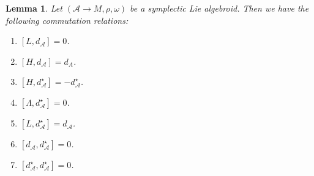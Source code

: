 \documentclass{amsart}
\newcommand{\ra}{\rightarrow}
\newtheorem{lemma}[theorem]{Lemma}
\newcommand{\A}{\mathcal{A}}
\theoremstyle{definition}
\begin{document}
\begin{lemma}\label{AlgebroidCommutators}
    Let $(\A \ra M,\rho,\omega)$ be a symplectic Lie algebroid. Then we have the following commutation relations:
    \begin{enumerate}
        \item $[L,d_\A]=0$.
        \item $[H,d_\A]=d_A$.
        \item $[H,d_\A^\star]=-d_\A^\star$.
        \item $[\Lambda , d_\A^\star]=0$.
        \item $[L,d_\A^\star]=d_\A$.
        \item $[d_\A,d_\A^\star]=0$.
        \item $[d_\A^\star,d_\A^\star]=0$.
    \end{enumerate}
\end{lemma}
\end{document}
